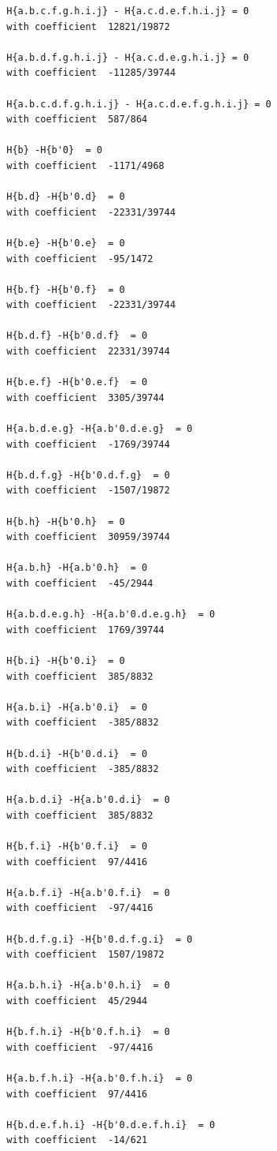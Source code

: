 \documentclass[11pt, a4paper]{kybernetika}
\begin{document}
\begin{verbatim}
		H{a.b.c.f.g.h.i.j} - H{a.c.d.e.f.h.i.j} = 0
		with coefficient  12821/19872
		
		H{a.b.d.f.g.h.i.j} - H{a.c.d.e.g.h.i.j} = 0
		with coefficient  -11285/39744
		
		H{a.b.c.d.f.g.h.i.j} - H{a.c.d.e.f.g.h.i.j} = 0
		with coefficient  587/864
		
		H{b} -H{b'0}  = 0
		with coefficient  -1171/4968
		
		H{b.d} -H{b'0.d}  = 0
		with coefficient  -22331/39744
		
		H{b.e} -H{b'0.e}  = 0
		with coefficient  -95/1472
		
		H{b.f} -H{b'0.f}  = 0
		with coefficient  -22331/39744
		
		H{b.d.f} -H{b'0.d.f}  = 0
		with coefficient  22331/39744
		
		H{b.e.f} -H{b'0.e.f}  = 0
		with coefficient  3305/39744
		
		H{a.b.d.e.g} -H{a.b'0.d.e.g}  = 0
		with coefficient  -1769/39744
		
		H{b.d.f.g} -H{b'0.d.f.g}  = 0
		with coefficient  -1507/19872
		
		H{b.h} -H{b'0.h}  = 0
		with coefficient  30959/39744
		
		H{a.b.h} -H{a.b'0.h}  = 0
		with coefficient  -45/2944
		
		H{a.b.d.e.g.h} -H{a.b'0.d.e.g.h}  = 0
		with coefficient  1769/39744
		
		H{b.i} -H{b'0.i}  = 0
		with coefficient  385/8832
		
		H{a.b.i} -H{a.b'0.i}  = 0
		with coefficient  -385/8832
		
		H{b.d.i} -H{b'0.d.i}  = 0
		with coefficient  -385/8832
		
		H{a.b.d.i} -H{a.b'0.d.i}  = 0
		with coefficient  385/8832
		
		H{b.f.i} -H{b'0.f.i}  = 0
		with coefficient  97/4416
		
		H{a.b.f.i} -H{a.b'0.f.i}  = 0
		with coefficient  -97/4416
		
		H{b.d.f.g.i} -H{b'0.d.f.g.i}  = 0
		with coefficient  1507/19872
		
		H{a.b.h.i} -H{a.b'0.h.i}  = 0
		with coefficient  45/2944
		
		H{b.f.h.i} -H{b'0.f.h.i}  = 0
		with coefficient  -97/4416
		
		H{a.b.f.h.i} -H{a.b'0.f.h.i}  = 0
		with coefficient  97/4416
		
		H{b.d.e.f.h.i} -H{b'0.d.e.f.h.i}  = 0
		with coefficient  -14/621
		

\end{verbatim}
\end{document}
